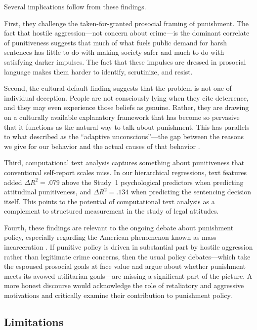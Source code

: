 Several implications follow from these findings.

First, they challenge the taken-for-granted prosocial framing of punishment. The fact that hostile aggression---not concern about crime---is the dominant correlate of punitiveness suggests that much of what fuels public demand for harsh sentences has little to do with making society safer and much to do with satisfying darker impulses. The fact that these impulses are dressed in prosocial language makes them harder to identify, scrutinize, and resist.

Second, the cultural-default finding suggests that the problem is not one of individual deception. People are not consciously lying when they cite deterrence, and they may even experience those beliefs as genuine. Rather, they are drawing on a culturally available explanatory framework that has become so pervasive that it functions as the natural way to talk about punishment. This has parallels to what \citet{Wilson2004} described as the ``adaptive unconscious''---the gap between the reasons we give for our behavior and the actual causes of that behavior \citep[see also][]{Haidt2001, NisbettWilson1977}.

Third, computational text analysis captures something about punitiveness that conventional self-report scales miss. In our hierarchical regressions, text features added $\Delta R^2 = .079$ above the Study~1 psychological predictors when predicting attitudinal punitiveness, and $\Delta R^2 = .134$ when predicting the sentencing decision itself. This points to the potential of computational text analysis as a complement to structured measurement in the study of legal attitudes.

Fourth, these findings are relevant to the ongoing debate about punishment policy, especially regarding the American phenomenon known as mass incarceration \citep[see][]{Garland2020, NRC2014, Tonry2018}. If punitive policy is driven in substantial part by hostile aggression rather than legitimate crime concerns, then the usual policy debates---which take the espoused prosocial goals at face value and argue about whether punishment meets its avowed utilitarian goals---are missing a significant part of the picture. A more honest discourse would acknowledge the role of retaliatory and aggressive motivations and critically examine their contribution to punishment policy.

\subsection{Limitations}

